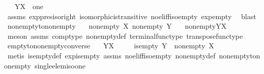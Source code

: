 \begin{isabellebody}
\ \ \ {\isachardoublequoteopen}Y\isactrlbsup X\isactrlesup \ {\isasymcong}\ one{\isachardoublequoteclose}\isanewline
%
\isadelimproof
\ \ %
\endisadelimproof
%
\isatagproof
{}\isamarkupfalse%
\ assms\ exp{\isacharunderscore}{\kern0pt}pres{\isacharunderscore}{\kern0pt}iso{\isacharunderscore}{\kern0pt}right\ isomorphic{\isacharunderscore}{\kern0pt}is{\isacharunderscore}{\kern0pt}transitive\ no{\isacharunderscore}{\kern0pt}el{\isacharunderscore}{\kern0pt}iff{\isacharunderscore}{\kern0pt}iso{\isacharunderscore}{\kern0pt}empty\ exp{\isacharunderscore}{\kern0pt}empty\ \isamarkupfalse%
\ blast%
\endisatagproof
{\isafoldproof}%
%
\isadelimproof
\isanewline
%
\endisadelimproof
\isanewline
{}\isamarkupfalse%
\ nonempty{\isacharunderscore}{\kern0pt}to{\isacharunderscore}{\kern0pt}nonempty{\isacharcolon}{\kern0pt}\isanewline
\ \ \ {\isachardoublequoteopen}nonempty\ X{\isachardoublequoteclose}\ {\isachardoublequoteopen}nonempty\ Y{\isachardoublequoteclose}\isanewline
\ \ \ {\isachardoublequoteopen}nonempty{\isacharparenleft}{\kern0pt}Y\isactrlbsup X\isactrlesup {\isacharparenright}{\kern0pt}{\isachardoublequoteclose}\isanewline
%
\isadelimproof
\ \ %
\endisadelimproof
%
\isatagproof
{}\isamarkupfalse%
\ {\isacharparenleft}{\kern0pt}meson\ assms{\isacharparenleft}{\kern0pt}{}{\isacharparenright}{\kern0pt}\ comp{\isacharunderscore}{\kern0pt}type\ nonempty{\isacharunderscore}{\kern0pt}def\ terminal{\isacharunderscore}{\kern0pt}func{\isacharunderscore}{\kern0pt}type\ transpose{\isacharunderscore}{\kern0pt}func{\isacharunderscore}{\kern0pt}type{\isacharparenright}{\kern0pt}%
\endisatagproof
{\isafoldproof}%
%
\isadelimproof
\isanewline
%
\endisadelimproof
\isanewline
{}\isamarkupfalse%
\ empty{\isacharunderscore}{\kern0pt}to{\isacharunderscore}{\kern0pt}nonempty{\isacharunderscore}{\kern0pt}converse{\isacharcolon}{\kern0pt}\isanewline
\ \ \ {\isachardoublequoteopen}Y\isactrlbsup X\isactrlesup \ {\isasymcong}\ {\isasymemptyset}{\isachardoublequoteclose}\isanewline
\ \ \ {\isachardoublequoteopen}is{\isacharunderscore}{\kern0pt}empty\ Y\ {\isasymand}\ nonempty\ X{\isachardoublequoteclose}\isanewline
%
\isadelimproof
\ \ %
\endisadelimproof
%
\isatagproof
{}\isamarkupfalse%
\ {\isacharparenleft}{\kern0pt}metis\ is{\isacharunderscore}{\kern0pt}empty{\isacharunderscore}{\kern0pt}def\ exp{\isacharunderscore}{\kern0pt}is{\isacharunderscore}{\kern0pt}empty\ assms\ no{\isacharunderscore}{\kern0pt}el{\isacharunderscore}{\kern0pt}iff{\isacharunderscore}{\kern0pt}iso{\isacharunderscore}{\kern0pt}empty\ nonempty{\isacharunderscore}{\kern0pt}def\ nonempty{\isacharunderscore}{\kern0pt}to{\isacharunderscore}{\kern0pt}nonempty\ single{\isacharunderscore}{\kern0pt}elem{\isacharunderscore}{\kern0pt}iso{\isacharunderscore}{\kern0pt}one{\isacharparenright}{\kern0pt}%

\end{isabellebody}
